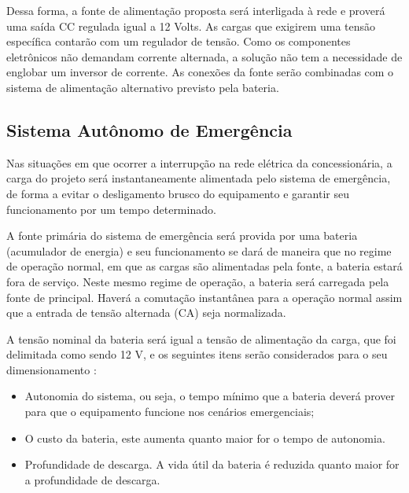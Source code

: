 Dessa forma, a fonte de alimentação proposta será interligada à rede e proverá uma saída CC regulada igual a 12 Volts. As cargas que exigirem uma tensão específica contarão com um regulador de tensão. Como os componentes eletrônicos não demandam corrente alternada, a solução não tem a necessidade de englobar um inversor de corrente. As conexões da fonte serão combinadas com o sistema de alimentação alternativo previsto pela bateria. 


\subsection{Sistema Autônomo de Emergência}

Nas situações em que ocorrer a interrupção na rede elétrica da concessionária, a carga do projeto será instantaneamente alimentada pelo sistema de emergência, de forma a evitar o desligamento brusco do equipamento e garantir seu funcionamento por um tempo determinado. 

A fonte primária do sistema de emergência será provida por uma bateria (acumulador de energia) e seu funcionamento se dará de maneira que no regime de operação normal, em que as cargas são alimentadas pela fonte, a bateria estará fora de serviço. Neste mesmo regime de operação, a bateria será carregada pela fonte de principal. Haverá a comutação instantânea para a operação normal assim que a entrada de tensão alternada (CA) seja normalizada.


A tensão nominal da bateria será igual a tensão de alimentação da carga, que foi delimitada como sendo 12 V, e os seguintes itens serão considerados para o seu dimensionamento \cite{bateria}:


\begin{itemize}
    \item Autonomia do sistema, ou seja, o tempo mínimo que a bateria deverá prover para que o equipamento funcione nos cenários emergenciais;
    \item O custo da bateria, este aumenta quanto maior for o tempo de autonomia.
    \item Profundidade de descarga. A vida útil da bateria é reduzida quanto maior for a profundidade de descarga.
\end{itemize}



